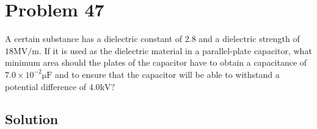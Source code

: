 \documentclass[12pt]{article}
\begin{document}
\pagebreak
\section{Problem 47}
A certain substance has a dielectric constant of $2.8$ and a dielectric strength of $18 \unit{\mega\volt/\meter}$. 
If it is used as the dielectric material in a parallel-plate capacitor, what minimum area should the plates of the capacitor have to obtain a capacitance of $7.0 \times 10^{-2} \unit{\micro\farad}$ and to ensure that the capacitor will be able to withstand a potential difference of $4.0 \unit{\kilo\volt}$?

\subsection*{Solution}
\end{document}
